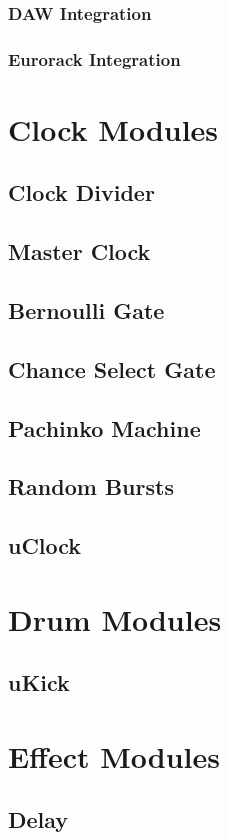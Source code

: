 \documentclass[11pt]{book}
\begin{document}
\subsection{DAW Integration}
\subsection{Eurorack Integration}


\chapter{Clock Modules}
\section{Clock Divider}
\section{Master Clock}
\section{Bernoulli Gate}
\section{Chance Select Gate}
\section{Pachinko Machine}
\section{Random Bursts}
\section{uClock}

\chapter{Drum Modules}
\section{uKick}

\chapter{Effect Modules}
\section{Delay}
\end{document}
